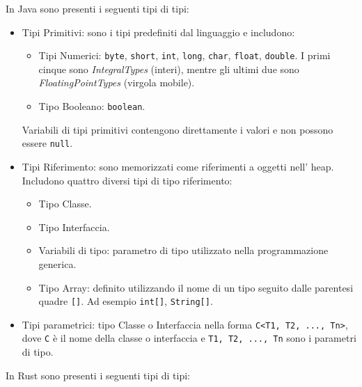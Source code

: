 In Java sono presenti i seguenti tipi di tipi:
\begin{itemize}
    \item Tipi Primitivi: sono i tipi predefiniti dal linguaggio e includono:
        \begin{itemize}
            \item Tipi Numerici: \texttt{byte}, \texttt{short}, \texttt{int}, \texttt{long}, \texttt{char}, \texttt{float}, \texttt{double}. I primi cinque sono \textit{IntegralTypes} (interi), mentre gli ultimi due sono \textit{FloatingPointTypes} (virgola mobile).
            \item Tipo Booleano: \texttt{boolean}.
        \end{itemize} 
        Variabili di tipi primitivi contengono direttamente i valori e non possono essere \texttt{null}.
    \item Tipi Riferimento: sono memorizzati come riferimenti a oggetti nell' heap. Includono quattro diversi tipi di tipo riferimento:
        \begin{itemize}
            \item Tipo Classe.
            \item Tipo Interfaccia.
            \item Variabili di tipo: parametro di tipo utilizzato nella programmazione generica. 
            \item Tipo Array: definito utilizzando il nome di un tipo seguito dalle parentesi quadre \texttt{[]}. Ad esempio \texttt{int[]}, \texttt{String[]}.
        \end{itemize}
    \item Tipi parametrici: tipo Classe o Interfaccia nella forma \texttt{C<T1, T2, ..., Tn>}, dove \texttt{C} è il nome della classe o interfaccia e \texttt{T1, T2, ..., Tn} sono i parametri di tipo.
\end{itemize}
In Rust sono presenti i seguenti tipi di tipi:
